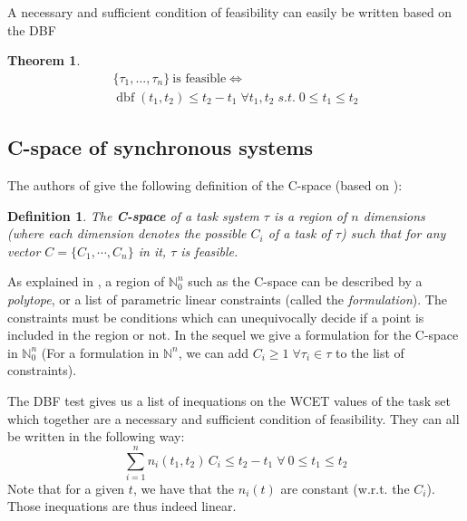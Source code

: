 \documentclass[conference]{IEEEtran}
\newtheorem{theorem}{Theorem}
\newtheorem{definition}{Definition}
\newcommand{\dbf}[1]{\operatorname{dbf}(#1)}
\begin{document}
		A necessary and sufficient condition of feasibility can easily be written
		based on the DBF \cite{baruah1999generalized}
		\begin{theorem} 
			\begin{equation*}
				\begin{array}{c}
					\{\tau_1, ..., \tau_n\} \: \text{is feasible}  \iff \\
					\dbf{t_1, t_2} \leq t_2 - t_1 \; \forall t_1,t_2 \; s.t. \; 0 \leq t_1 \leq t_2
				\end{array}
			\end{equation*} 
		\end{theorem}
	\subsection{C-space of synchronous systems}
	\label{sct:cspaceDescr}

			The authors of \cite{george2009characterization} give the following definition of the C-space (based on \cite{bini2004schedulability}):
			\begin{definition}
				The \textbf{C-space} of a task system $\tau$ is a region of $n$ dimensions (where each dimension denotes the possible $C_i$ of a task of $\tau$) such that for any vector $C = \{ C_1, \cdots, C_{n}\}$ in it, $\tau$ is feasible.
			\end{definition}

			As explained in \cite{nemhauser1988integer}, a region of $\mathbb{N}_0^n$
			such as the C-space can be described by a \emph{polytope}, or a list of
			parametric linear constraints (called the \emph{formulation}). The
			constraints must be conditions which can unequivocally decide if a point is
			included in the region or not. In the sequel we give a formulation for the
			C-space in $\mathbb{N}_0^n$ (For a formulation in $\mathbb{N}^n$, we can add
			$C_i \geqslant 1 \; \forall \tau_i \in \tau$ to the list of constraints).

		The DBF test gives us a list of inequations on the WCET values of the task set
		which together are a necessary and sufficient condition of feasibility. They
		can all be written in the following way:
		\begin{equation}
			\sum_{i=1}^{n} n_i(t_1, t_2) \, C_i \leq t_2 - t_1 \; \forall \: 0 \leq t_1 \leq t_2
		\end{equation}
		Note that for a given $t$, we have that the $n_i(t)$ are
		constant (w.r.t. the $C_i$). Those inequations are thus indeed linear.
\end{document}
